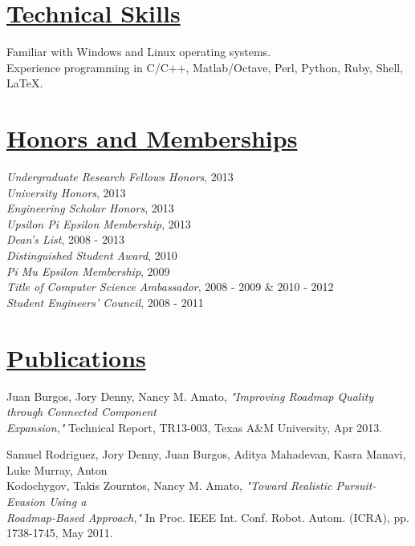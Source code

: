 \documentclass[8pt]{res}
\begin{document}
\begin{resume}
    \section{\underline{Technical Skills}}        
    Familiar with Windows and Linux operating systems. \\
    Experience programming in C/C++, Matlab/Octave, Perl, Python, Ruby, Shell, \LaTeX.


    \section{\underline{Honors and Memberships}}          
    \vspace{+0.02in}	
    \emph{Undergraduate Research Fellows Honors}, 2013 \\
    \emph{University Honors}, 2013 \\
    \emph{Engineering Scholar Honors}, 2013 \\
    \emph{Upsilon Pi Epsilon Membership}, 2013 \\
    \emph{Dean's List}, 2008 - 2013 \\
    \emph{Distinguished Student Award}, 2010 \\
    \emph{Pi Mu Epsilon Membership}, 2009 \\
    \emph{Title of Computer Science Ambassador}, 2008 - 2009 \& 2010 - 2012 \\
    \emph{Student Engineers' Council}, 2008 - 2011 \\
    \vspace{-0.1in}	


    \section{\underline{Publications}}
      Juan Burgos, Jory Denny, Nancy M. Amato, \emph{"Improving Roadmap Quality through Connected Component \\
      Expansion,"} Technical Report, TR13-003, Texas A\&M University, Apr 2013.

      Samuel Rodriguez, Jory Denny, Juan Burgos, Aditya Mahadevan, Kasra Manavi, Luke Murray, Anton \\
      Kodochygov, Takis Zourntos, Nancy M. Amato, \emph{"Toward Realistic Pursuit-Evasion Using a \\
      Roadmap-Based Approach,"} In Proc. IEEE Int. Conf. Robot. Autom. (ICRA), pp. 1738-1745, May 2011. 


\end{resume}
\end{document}
